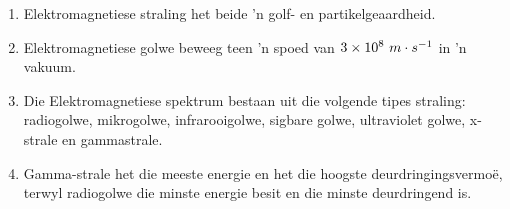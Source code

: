 \begin{enumerate}[noitemsep, label=\textbf{\arabic*}. ] 
\item Elektromagnetiese straling het beide 'n golf- en partikelgeaardheid.
\item Elektromagnetiese golwe beweeg teen 'n spoed van $3\ensuremath{\times}{10}^{8}\phantom{\rule{3.33333pt}{0ex}}m\ensuremath{\cdot}{s}^{-1}$ in 'n vakuum.
\item Die Elektromagnetiese spektrum bestaan uit die volgende tipes straling: radiogolwe, mikrogolwe, infrarooigolwe, sigbare golwe, ultraviolet golwe, x-strale en gammastrale. 
\item Gamma-strale het die meeste energie en het die hoogste deurdringingsvermo\"e, terwyl radiogolwe die minste energie besit en die minste deurdringend is. 
\end{enumerate}

